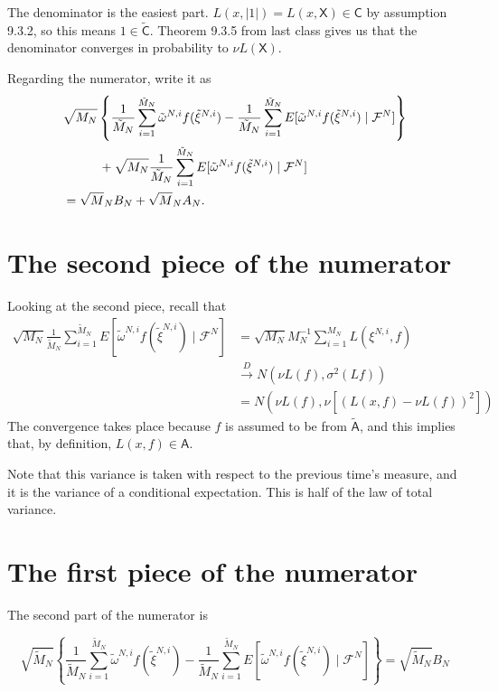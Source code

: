 \documentclass{article}
\begin{document}
The denominator is the easiest part. $L(x, |1|) = L(x,\mathsf{X}) \in \mathsf{C}$ by assumption 9.3.2, so this means $1 \in \tilde{\mathsf{C}}$. Theorem 9.3.5 from last class gives us that the denominator converges in probability to $\nu L(\mathsf{X})$.

Regarding the numerator, write it as 
\begin{align*}
&\sqrt{M_N}\left\{  \frac{1}{\tilde{M}_N} \sum_{i=1}^{\tilde{M}_N} \tilde{\omega}^{N,i} f(\tilde{\xi}^{N,i}) -  \frac{1}{\tilde{M}_N} \sum_{i=1}^{\tilde{M}_N} E[ \tilde{\omega}^{N,i} f(\tilde{\xi}^{N,i}) \mid \mathcal{F}^N] \right\} \\
& \hspace{10mm} + \sqrt{M_N} \frac{1}{\tilde{M}_N} \sum_{i=1}^{\tilde{M}_N}  E[ \tilde{\omega}^{N,i} f(\tilde{\xi}^{N,i}) \mid \mathcal{F}^N] \\
&= \sqrt{M}_N B_N + \sqrt{M}_N A_N.
\end{align*}


\section{The second piece of the numerator}

Looking at the second piece, recall that 
\begin{align*}
\sqrt{M_N} \frac{1}{\tilde{M}_N} \sum_{i=1}^{\tilde{M}_N}  E[ \tilde{\omega}^{N,i} f(\tilde{\xi}^{N,i}) \mid \mathcal{F}^N]
&= \sqrt{M_N}  M_N^{-1} \sum_{i=1}^{M_N}   L(\xi^{N,i},f) \\ 
&\overset{D}{\to} N(\nu L(f) , \sigma^2(Lf)) \\
&= N(\nu L(f) , \nu\left[ \left(L(x,f) - \nu L (f) \right)^2 \right])
\end{align*}
The convergence takes place because $f$ is assumed to be from $\tilde{\mathsf{A}}$, and this implies that, by definition, $L(x,f) \in \mathsf{A}$. 

Note that this variance is taken with respect to the previous time's measure, and it is the variance of a conditional expectation. This is half of the law of total variance.

\section{The first piece of the numerator}

The second part of the numerator is 

$$
\sqrt{\tilde{M}_N}\left\{  \frac{1}{\tilde{M}_N} \sum_{i=1}^{\tilde{M}_N} \tilde{\omega}^{N,i} f(\tilde{\xi}^{N,i}) -  \frac{1}{\tilde{M}_N} \sum_{i=1}^{\tilde{M}_N} E[ \tilde{\omega}^{N,i} f(\tilde{\xi}^{N,i}) \mid \mathcal{F}^N] \right\} = \sqrt{\tilde{M}_N} B_N
$$
\end{document}
